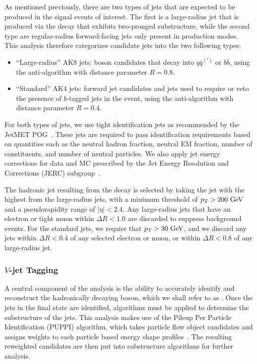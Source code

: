 As mentioned previously, there are two types of jets that are expected to be produced in the signal events of interest.
The first is a large-radius jet that is produced via the \VorH decay that exhibits two-pronged substructure, while the second type are regular-radius forward-facing jets only present in \VBF production modes.
This analysis therefore categorizes candidate jets into the two following types:
\begin{itemize}
  \item ``Large-radius'' AK8 jets: \VorH boson candidates that decay into $q\bar{q}^{(\prime)}$ or $b\bar{b}$, using the anti-\kt algorithm with distance parameter $R=0.8$.
  \item ``Standard'' AK4 jets: \VBF forward jet candidates and jets used to require or veto the presence of $b$-tagged jets in the event, using the anti-\kt algorithm with distance parameter $R=0.4$.
\end{itemize}

For both types of jets, we use tight identification jets as recommended by the JetMET POG~\cite{jetID2016,jetID2017,jetID2018}.
These jets are required to pass identification requirements based on quantities such as the neutral hadron fraction, neutral EM fraction, number of constituents, and number of neutral particles.
We also apply jet energy corrections for data and MC prescribed by the Jet Energy Resolution and Corrections (JERC) subgroup~\cite{JetEnergyScale}.

The hadronic jet resulting from the \VorH decay is selected by taking the jet with the highest \pt from the large-radius jets, with a minimum threshold of $\pt>200\unit{GeV}$ and a pseudorapidity range of $|\eta|<2.4$.
Any large-radius jets that have an electron or tight muon within $\Delta R<1.0$ are discarded to suppress background events.
For the standard jets, we require that $\pt>30\unit{GeV}$, and we discard any jets within $\Delta R<0.4$ of any selected electron or muon, or within $\Delta R<0.8$ of any large-radius jet.

\subsubsection{$V$-jet Tagging}

A central component of the analysis is the ability to accurately identify and reconstruct the hadronically decaying \VorH boson, which we shall refer to as \Vhad.
Once the jets in the final state are identified, algorithms must be applied to determine the substructure of the jets.
This analysis makes use of the Pileup Per Particle Identification (PUPPI) algorithm, which takes particle flow object candidates and assigns weights to each particle based energy shape profiles~\cite{Bertolini_2014}.
The resulting reweighted candidates are then put into substructure algorithms for further analysis.

